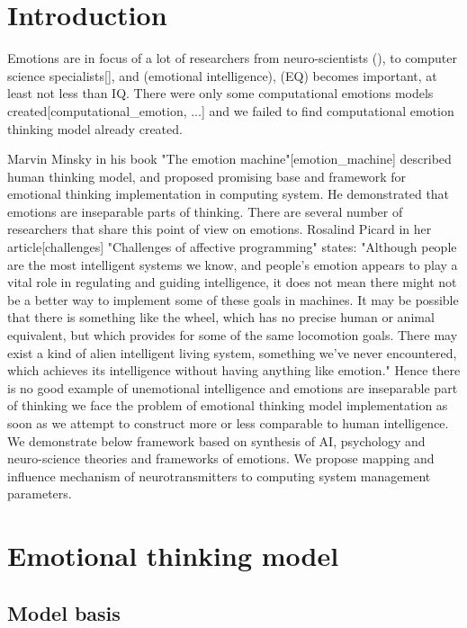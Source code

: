\section{Introduction}

Emotions are in focus of a lot of researchers from neuro-scientists (), to computer science specialists[], and (emotional intelligence), (EQ) becomes important, at least not less than IQ.
There were only some computational emotions models created[computational_emotion, ...] and we failed to find computational emotion thinking model already created.

Marvin Minsky in his book "The emotion machine"[emotion_machine] described human thinking model, and proposed promising base and framework for emotional thinking implementation in computing system. He demonstrated that emotions are inseparable parts of thinking. There are several number of researchers that share this point of view on emotions. Rosalind Picard in her article[challenges] "Challenges of affective programming" states: "Although people are the most intelligent systems we know, and people’s emotion appears to play a vital role in regulating and guiding intelligence, it does not mean there might not be a better way to implement some of these goals in machines. It may be possible that there is something like the wheel, which has no precise human or animal equivalent, but which provides for some of the same locomotion goals. There may exist a kind of alien intelligent living system, something we’ve never encountered, which achieves its intelligence without having anything like emotion."  Hence there is no good example of unemotional intelligence and emotions are inseparable part of thinking we face the problem of emotional thinking model implementation as soon as we attempt to construct more or less comparable to human intelligence. We demonstrate below framework based on synthesis of AI, psychology and neuro-science theories and frameworks of emotions. We propose mapping and influence mechanism of neurotransmitters to computing system management parameters.

\section{Emotional thinking model}

\subsection{Model basis}

